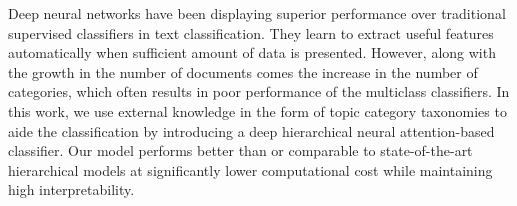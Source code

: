 Deep neural networks have been displaying superior  performance over traditional supervised classifiers in text classification. They learn to extract useful features automatically when sufficient amount of data is presented. However, along with the growth in the number of documents comes the increase in the number of categories, which often results in poor performance of the multiclass classifiers. In this work, we use external knowledge in the form of topic category taxonomies to aide the classification by introducing a deep hierarchical neural attention-based classifier.  Our model performs better than or comparable to state-of-the-art hierarchical models at significantly lower computational cost while maintaining high interpretability.
